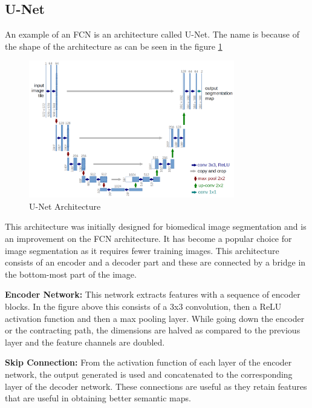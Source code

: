 \documentclass[rnd]{mas_proposal}
\begin{document}
\subsection{U-Net}
An example of an FCN is an architecture called U-Net. The name is because of the shape of the architecture as can be seen in the figure \ref{fig:u-net} 

\begin{figure}[htp] 
        \centering
        \includegraphics[width=0.8\textwidth]{images/u-net-architecture.png}
        \caption{U-Net Architecture \cite{u-net}}%
        \label{fig:u-net}%
\end{figure}

This architecture was initially designed for biomedical image segmentation and is an improvement on the FCN architecture. \cite{u-net} It has become a popular choice for image segmentation as it requires fewer training images. 
This architecture consists of an encoder and a decoder part and these are connected by a bridge in the bottom-most part of the image. 

\textbf{Encoder Network:} This network extracts features with a sequence of encoder blocks. In the figure above this consists of a 3x3 convolution, then a ReLU activation function and then a max pooling layer. While going down the encoder or the contracting path, the dimensions are halved as compared to the previous layer and the feature channels are doubled. 

\textbf{Skip Connection:} From the activation function of each layer of the encoder network, the output generated is used and concatenated to the corresponding layer of the decoder network. These connections are useful as they retain features that are useful in obtaining better semantic maps.
\end{document}
